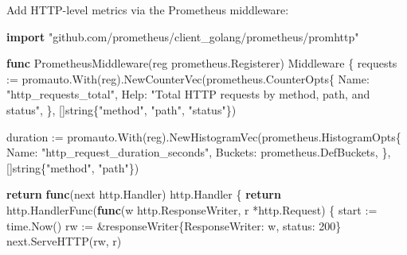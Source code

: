 \documentclass[
]{article}
\newenvironment{Shaded}{}{}
\newcommand{\ControlFlowTok}[1]{\textcolor[rgb]{0.00,0.44,0.13}{\textbf{#1}}}
\newcommand{\DataTypeTok}[1]{\textcolor[rgb]{0.56,0.13,0.00}{#1}}
\newcommand{\DecValTok}[1]{\textcolor[rgb]{0.25,0.63,0.44}{#1}}
\newcommand{\KeywordTok}[1]{\textcolor[rgb]{0.00,0.44,0.13}{\textbf{#1}}}
\newcommand{\NormalTok}[1]{#1}
\newcommand{\OperatorTok}[1]{\textcolor[rgb]{0.40,0.40,0.40}{#1}}
\newcommand{\StringTok}[1]{\textcolor[rgb]{0.25,0.44,0.63}{#1}}
\begin{document}
Add HTTP-level metrics via the Prometheus middleware:

\begin{Shaded}
\begin{Highlighting}[]
\KeywordTok{import} \StringTok{"github.com/prometheus/client\_golang/prometheus/promhttp"}

\KeywordTok{func}\NormalTok{ PrometheusMiddleware}\OperatorTok{(}\NormalTok{reg prometheus}\OperatorTok{.}\NormalTok{Registerer}\OperatorTok{)}\NormalTok{ Middleware }\OperatorTok{\{}
\NormalTok{    requests }\OperatorTok{:=}\NormalTok{ promauto}\OperatorTok{.}\NormalTok{With}\OperatorTok{(}\NormalTok{reg}\OperatorTok{).}\NormalTok{NewCounterVec}\OperatorTok{(}\NormalTok{prometheus}\OperatorTok{.}\NormalTok{CounterOpts}\OperatorTok{\{}
\NormalTok{        Name}\OperatorTok{:} \StringTok{"http\_requests\_total"}\OperatorTok{,}
\NormalTok{        Help}\OperatorTok{:} \StringTok{"Total HTTP requests by method, path, and status"}\OperatorTok{,}
    \OperatorTok{\},} \OperatorTok{[]}\DataTypeTok{string}\OperatorTok{\{}\StringTok{"method"}\OperatorTok{,} \StringTok{"path"}\OperatorTok{,} \StringTok{"status"}\OperatorTok{\})}

\NormalTok{    duration }\OperatorTok{:=}\NormalTok{ promauto}\OperatorTok{.}\NormalTok{With}\OperatorTok{(}\NormalTok{reg}\OperatorTok{).}\NormalTok{NewHistogramVec}\OperatorTok{(}\NormalTok{prometheus}\OperatorTok{.}\NormalTok{HistogramOpts}\OperatorTok{\{}
\NormalTok{        Name}\OperatorTok{:}    \StringTok{"http\_request\_duration\_seconds"}\OperatorTok{,}
\NormalTok{        Buckets}\OperatorTok{:}\NormalTok{ prometheus}\OperatorTok{.}\NormalTok{DefBuckets}\OperatorTok{,}
    \OperatorTok{\},} \OperatorTok{[]}\DataTypeTok{string}\OperatorTok{\{}\StringTok{"method"}\OperatorTok{,} \StringTok{"path"}\OperatorTok{\})}

    \ControlFlowTok{return} \KeywordTok{func}\OperatorTok{(}\NormalTok{next http}\OperatorTok{.}\NormalTok{Handler}\OperatorTok{)}\NormalTok{ http}\OperatorTok{.}\NormalTok{Handler }\OperatorTok{\{}
        \ControlFlowTok{return}\NormalTok{ http}\OperatorTok{.}\NormalTok{HandlerFunc}\OperatorTok{(}\KeywordTok{func}\OperatorTok{(}\NormalTok{w http}\OperatorTok{.}\NormalTok{ResponseWriter}\OperatorTok{,}\NormalTok{ r }\OperatorTok{*}\NormalTok{http}\OperatorTok{.}\NormalTok{Request}\OperatorTok{)} \OperatorTok{\{}
\NormalTok{            start }\OperatorTok{:=}\NormalTok{ time}\OperatorTok{.}\NormalTok{Now}\OperatorTok{()}
\NormalTok{            rw }\OperatorTok{:=} \OperatorTok{\&}\NormalTok{responseWriter}\OperatorTok{\{}\NormalTok{ResponseWriter}\OperatorTok{:}\NormalTok{ w}\OperatorTok{,}\NormalTok{ status}\OperatorTok{:} \DecValTok{200}\OperatorTok{\}}
\NormalTok{            next}\OperatorTok{.}\NormalTok{ServeHTTP}\OperatorTok{(}\NormalTok{rw}\OperatorTok{,}\NormalTok{ r}\OperatorTok{)}


\end{Highlighting}
\end{Shaded}
\end{document}
